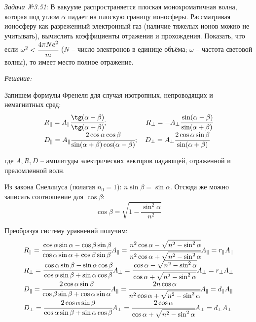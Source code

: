 \newpage

\emph{Задача №3.51}: В вакууме распространяется плоская монохроматичная 
волна, которая под углом \( \alpha \) падает на плоскую границу ионосферы. 
Рассматривая ионосферу как разреженный электронный газ (наличие тяжелых 
ионов можно не учитывать), вычислить коэффициенты отражения и прохождения. 
Показать, что если \( \omega^2 < \cfrac{4\pi Ne^2}{m} \) (\(N\) -- число 
электронов в единице объёма; \( \omega \) -- частота световой волны), то 
имеет место полное отражение.

\emph{Решение:}

Запишем формулы Френеля для случая изотропных, непроводящих и немагнитных 
сред:
\[
	\begin{array}{ll}
		R_{\Vert} = A_{\Vert}\cfrac{\tg(\alpha-\beta)}{\tg(\alpha+\beta)};
		\hspace{13ex}
		R_{\bot} = -A_{\bot}\cfrac{\sin(\alpha-\beta)}{\sin(\alpha+\beta)} \\
		D_{\Vert} = A_{\Vert}\cfrac{2\cos\alpha\cos\beta}
			{\sin(\alpha+\beta)\cos(\alpha-\beta)};\quad
		D_{\bot} = A_{\bot}\cfrac{2\cos\alpha\sin\beta}{\sin(\alpha+\beta)}
	\end{array}
\]

где \( A, R, D \) -- амплитуды электрических векторов падающей, отраженной 
и преломленной волн.

Из закона Снеллиуса (полагая \( n_0 = 1 \)): \( n\sin\beta = \sin\alpha \). 
Отсюда же можно записать соотношение для \( \cos\beta \):
\[
	\cos\beta = \sqrt{1-\frac{\sin^2\alpha}{n^2}}
\]

Преобразуя систему уравнений получим:
\[
	\begin{array}{ll}
		R_{\Vert} = \cfrac{\cos\alpha\sin\alpha - \cos\beta\sin\beta}
			{\cos\alpha\sin\alpha + \cos\beta\sin\beta}A_{\Vert} = 
			\cfrac{n^2\cos\alpha - \sqrt{n^2-\sin^2\alpha}}
			{n^2\cos\alpha + \sqrt{n^2-\sin^2\alpha}} A_{\Vert} = 
			r_{\Vert} A_{\Vert} \\
		R_{\bot} = \cfrac{\cos\alpha\sin\beta - \sin\alpha\cos\beta}
			{\cos\alpha\sin\beta + \sin\alpha\cos\beta}A_{\bot} = 
			\cfrac{\cos\alpha - \sqrt{n^2-\sin^2\alpha}}
			{\cos\alpha + \sqrt{n^2-\sin^2\alpha}}A_{\bot} = 
			r_{\bot} A_{\bot} \\
		D_{\Vert} = \cfrac{2\cos\alpha\sin\beta}
			{\cos\beta\sin\beta + \cos\alpha\sin\alpha}A_{\Vert} = 
			\cfrac{2n\cos\alpha}{n^2\cos\alpha + \sqrt{n^2-\sin^2\alpha}}
			A_{\Vert} = d_{\Vert} A_{\Vert} \\
		D_{\bot} = \cfrac{2\cos\alpha\sin\beta}
			{\cos\alpha\sin\beta + \sin\alpha\cos\beta}A_{\bot} =
			\cfrac{2\cos\alpha}{\cos\alpha + \sqrt{n^2-\sin^2\alpha}}
			A_{\bot} = d_{\bot} A_{\bot}
	\end{array}
\]


